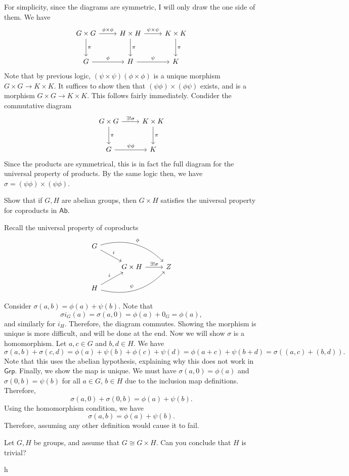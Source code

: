 \documentclass[11pt]{report}
\begin{document}
\begin{solution}
	For simplicity, since the diagrams are symmetric, I will only draw the one side of them. We have
	\[\begin{tikzcd}[row sep = 2.5em, column sep = 2.5em]
		G\times G\arrow[r, "\phi \times \phi "]\arrow[d, "\pi "]&H\times H\arrow[r, "\psi \times \psi "]\arrow[d, "\pi "]&K\times K\arrow[d, "\pi "]\\
		G\arrow[r, "\phi "]&H\arrow[r, "\psi "]&K
	\end{tikzcd}\]
	Note that by previous logic, $(\psi \times \psi )(\phi \times \phi )$ is a unique morphism $G\times G \to K\times K$. It suffices to show then that $(\psi \phi )\times (\phi \psi )$ exists, and is a morphism $G\times G\to K\times K$. This follows fairly immediately. Condider the commutative diagram
	\[\begin{tikzcd}[row sep = 2.5em, column sep = 2.5em]
		G\times G\arrow[r, "\exists !\sigma "]\arrow[d, "\pi "]&K\times K\arrow[d, "\pi "]\\
		G\arrow[r, "\psi \phi "]&K
	\end{tikzcd}\]
	Since the products are symmetrical, this is in fact the full diagram for the universal property of products. By the same logic then, we have $\sigma =(\psi \phi )\times (\psi \phi )$.
\end{solution}
\begin{exercise}
	Show that if $G,H$ are abelian groups, then $G\times H$ satisfies the universal property for coproducts in $\mathsf{Ab} $.
\end{exercise}
\begin{solution}
	Recall the universal property of coproducts
	\[\begin{tikzcd}[row sep = 1.5em, column sep = 2.5em]
		G\arrow[dr, "i"]\arrow[drr, bend left, "\phi "]\\
		&G\times H\arrow[r, "\exists ! \sigma "]&Z\\
		H\arrow[ur, "i"]\arrow[urr, bend right, "\psi "]
	\end{tikzcd}\]
	Consider $\sigma (a,b)=\phi (a)+\psi (b)$. Note that
	\[
		\sigma i_G(a)=\sigma (a,0)=\phi (a)+0_G=\phi (a),
	\]
	and similarly for $i_H$. Therefore, the diagram commutes. Showing the morphism is unique is more difficult, and will be done at the end. Now we will show $\sigma $ is a homomorphism. Let $a,c\in G$ and $b,d\in H$. We have
	\[
		\sigma (a,b)+\sigma (c,d)=\phi (a)+\psi (b)+\phi (c)+\psi (d)=\phi (a+c)+\psi (b+d)=\sigma ((a,c)+(b,d))
	.\]
	Note that this uses the abelian hypothesis, explaining why this does not work in $\mathsf{Grp} $. Finally, we show the map is unique. We must have $\sigma (a,0)=\phi (a)$ and $\sigma (0,b)=\psi (b)$ for all $a\in G$, $b\in H$ due to the inclusion map definitions. Therefore,
	\[
		\sigma (a,0)+\sigma (0,b)=\phi (a)+\psi (b)
	.\]
	Using the homomorphism condition, we have
	\[
		\sigma (a,b)=\phi (a)+\psi (b)
	.\]
	Therefore, assuming any other definition would cause it to fail.
\end{solution}
\begin{exercise}
	Let $G,H$ be groups, and assume that $G\cong G\times H$. Can you conclude that $H$ is trivial?
\end{exercise}
\begin{solution}
	h
\end{solution}
\end{document}
